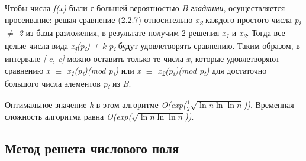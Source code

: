   Чтобы числа \textit{f(x)} были с большей вероятностью \textit{B-гладкими}, осуществляется просеивание: решая сравнение (2.2.7) относительно \textit{x\textsubscript{2}}
  каждого простого числа \textit{p\textsubscript{i} {$\ne$} 2} из базы разложения, в результате получим 2 решения \textit{x\textsubscript{1}} и \textit{x\textsubscript{2}}. 
  Тогда все целые числа вида \textit{x\textsubscript{j}(p\textsubscript{i}) + k p\textsubscript{i}} будут удовлетворять сравнению. Таким образом, в 
  интервале \textit{[-c, c]} можно оставить только те числа \textit{x}, которые удовлетворяют сравнению \textit{x {$\equiv$} x\textsubscript{1}(p\textsubscript{i})(mod p\textsubscript{i})} 
  или \textit{x {$\equiv$} x\textsubscript{2}(p\textsubscript{i})(mod p\textsubscript{i})} для достаточно большого числа элементов 
  \textit{p\textsubscript{i}} из \textit{B}.
  
  Оптимальное значение \textit{h} в этом алгоритме \textit{O(exp({$\frac{1}{2}$}{$\sqrt{\ln{n}\ln{\ln{n}}}$}))}. Временная сложность 
  алгоритма равна \textit{O(exp({$\sqrt{\ln{n}\ln{\ln{n}}}$}))}.
  
    \begin{example}
    \end{example}

\subsection{Метод решета числового поля}